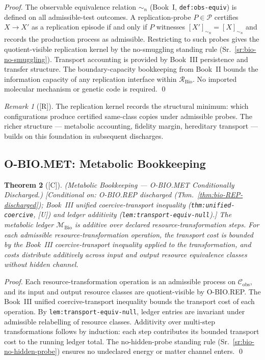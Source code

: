 \documentclass[12pt,oneside]{amsbook}
\theoremstyle{plain}
\newtheorem{theorem}{Theorem}[section]
\theoremstyle{definition}
\theoremstyle{remark}
\newtheorem{remark}[theorem]{Remark}
\newcommand{\status}[1]{\textup{[#1]}}
\begin{document}
\begin{proof}
The observable equivalence relation $\sim_n$ (Book~I,
\texttt{def:obs-equiv}) is defined on all admissible-test outcomes.
A replication-probe $P \in \mathcal{P}$ certifies $X \to X'$ as a
replication episode if and only if $P$ witnesses
$[X']_{\sim_n} = [X]_{\sim_n}$ and records the production process
as admissible. Restricting to such probes gives the quotient-visible
replication kernel by the no-smuggling standing rule
(Sr.~\ref{sr:bio-no-smuggling}). Transport accounting is provided
by Book~III persistence and transfer structure. The boundary-capacity
bookkeeping from Book~II bounds the information capacity of any
replication interface within $\mathcal{R}_{\mathrm{Bio}}$. No
imported molecular mechanism or genetic code is required.
\qed
\end{proof}

\begin{remark}[\status{R}]\label{rem:bio-REP-scope}
The replication kernel records the structural minimum: which
configurations produce certified same-class copies under admissible
probes. The richer structure --- metabolic accounting, fidelity
margin, hereditary transport --- builds on this foundation in
subsequent discharges.
\end{remark}

\subsection{O-BIO.MET: Metabolic Bookkeeping}\label{sec:bio-MET-discharge}

\begin{theorem}[\status{C}]\label{thm:bio-MET-discharged}
\textup{(Metabolic Bookkeeping --- O-BIO.MET Conditionally Discharged.)}
\textup{[Conditional on: O-BIO.REP discharged
(Thm.~\ref{thm:bio-REP-discharged}); Book~III unified
coercive-transport inequality (\texttt{thm:unified-coercive}, [U])
and ledger additivity (\texttt{lem:transport-equiv-null}).]}
The metabolic ledger $\mathcal{M}_{\mathrm{Bio}}$ is additive over
declared resource-transformation steps. For each admissible
resource-transformation operation, the transport cost is bounded by
the Book~III coercive-transport inequality applied to the
transformation, and costs distribute additively across input and
output resource equivalence classes without hidden channel.
\end{theorem}

\begin{proof}
Each resource-transformation operation is an admissible process on
$\mathcal{C}_{\mathrm{obs}}$, and its input and output resource
classes are quotient-visible by O-BIO.REP. The Book~III unified
coercive-transport inequality bounds the transport cost of each
operation. By \texttt{lem:transport-equiv-null}, ledger entries
are invariant under admissible relabelling of resource classes.
Additivity over multi-step transformations follows by induction: each
step contributes its bounded transport cost to the running ledger
total. The no-hidden-probe standing rule (Sr.~\ref{sr:bio-no-hidden-probe})
ensures no undeclared energy or matter channel enters.
\qed
\end{proof}
\end{document}

